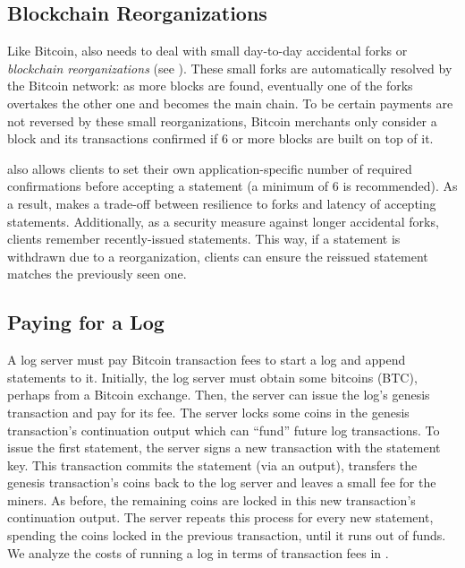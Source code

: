 \subsection{Blockchain Reorganizations}
\label{sec:catena:design:reorgs}
Like Bitcoin, \Sys also needs to deal with small day-to-day accidental forks or \emph{blockchain reorganizations} (see ).
These small forks are automatically resolved by the Bitcoin network: as more blocks are found, eventually one of the forks overtakes the other one and becomes the main chain\cite{blockchainproto}.
To be certain payments are not reversed by these small reorganizations, Bitcoin merchants only consider a block and its transactions confirmed if 6 or more blocks are built on top of it.

\Sys also allows clients to set their own application-specific number of required confirmations before accepting a statement (a minimum of 6 is recommended).
As a result, \Sys makes a trade-off between resilience to forks and latency of accepting statements.
Additionally, as a security measure against longer accidental forks, \Sys clients remember recently-issued statements.
This way, if a statement is withdrawn due to a reorganization, \Sys clients can ensure the reissued statement matches the previously seen one.


\subsection{Paying for a \Sys Log}
\label{sec:catena:design:refund}
A \Sys log server must pay Bitcoin transaction fees to start a log and append statements to it.
Initially, the \Sys log server must obtain some bitcoins (BTC), perhaps from a Bitcoin exchange\cite{bitcoin-exchanges}.
Then, the server can issue the log's genesis transaction and pay for its fee.
The server locks some coins in the genesis transaction's continuation output which can ``fund'' future log transactions.
To issue the first statement, the server signs a new \Sys transaction with the statement key.
This transaction commits the statement (via an \opret output), transfers the genesis transaction's coins back to the log server and leaves a small fee for the miners.
As before, the remaining coins are locked in this new transaction's continuation output.
The server repeats this process for every new statement, spending the coins locked in the previous \Sys transaction, until it runs out of funds.
We analyze the costs of running a \Sys log in terms of transaction fees in .

